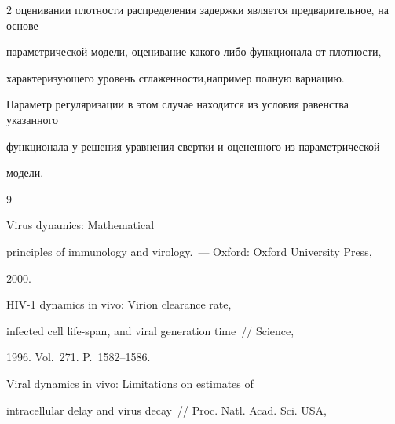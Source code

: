 \begin{multicols}{2}
оценивании плотности распределения задержки является предварительное, на основе


параметрической модели, оценивание какого-либо функционала от плотности,


характеризующего уровень сглаженности,\linebreak например полную вариацию.


Параметр регуляризации в этом случае находится из условия равенства указанного


функционала у решения уравнения свертки и оцененного из параметрической


модели.





{\small\frenchspacing


{%




\begin{thebibliography}{9}









Virus dynamics: Mathematical


principles of immunology and virology.~--- Oxford: Oxford University Press,


 2000.









HIV-1 dynamics in vivo: Virion clearance rate,


infected cell life-span, and viral generation time~// Science,


1996. Vol.~271. P.~1582--1586.









Viral dynamics in vivo: Limitations on estimates of


intracellular delay and virus decay~// Proc. Natl. Acad. Sci. USA,



\end{thebibliography}}}
\end{multicols}
